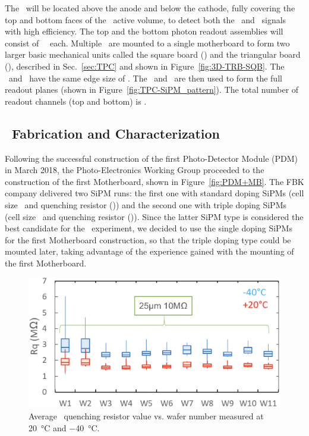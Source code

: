 The \DSkPdms\ will be located above the anode and below the cathode, fully covering the top and bottom faces of the \LArTPC\ active volume, to detect both the \SOne\ and \STwo\ signals with high efficiency.  The top and the bottom photon readout assemblies will consist of \DSkTilesHalfNumber\ \DSkPdms\ each.  Multiple \DSkPdms\ are mounted to a single motherboard to form two larger basic mechanical units called the square board (\SQB)  and the triangular board (\TRB),  described in Sec.~\ref{sec:TPC} and shown  in Figure~\ref{fig:3D-TRB-SQB}.  The \SQB\ and \TRB\ have the same edge size of \DSkSQBTRBSize.  The \SQB\ and \TRB\ are then used to form the full readout planes (shown in Figure~\ref{fig:TPC-SiPM_pattern}).  The total number of readout channels (top and bottom) is \DSkTilesNumber.


\subsection{\DSkPdm\ Fabrication and Characterization}

Following the successful construction of the first Photo-Detector Module (PDM) in March 2018, the Photo-Electronics Working Group proceeded to the construction of the first Motherboard, shown in  Figure~\ref{fig:PDM+MB}. The FBK company delivered two SiPM runs: the first one with standard doping SiPMs (cell size \DSkSiPMSPADSizeStd\ and quenching resistor \DSkSiPMSPADQuenchingResistorSingleDoping(\LINNormalTemperature)) and the second one with triple doping SiPMs (cell size \DSkSiPMSPADSizeTripleDoping\ and quenching resistor \DSkSiPMSPADQuenchingResistorTripleDoping(\LINNormalTemperature)). Since the latter SiPM type is considered the best candidate for the \DSks\ experiment, we decided to use the single doping SiPMs for the first Motherboard construction, so that the triple doping type could be mounted later, taking advantage of the experience gained with the mounting of the first Motherboard.

\begin{figure} [t]
\includegraphics[width=\columnwidth]{./Figures/Rq.png}
\caption[Variance of impedance of \SiPMs\ quenching resistors]{Average \SiPM\ quenching resistor value vs. wafer number measured at \SI{20}{\celsius} and \SI{-40}{\celsius}.}
\label{fig:Rq} 
\end{figure} 

